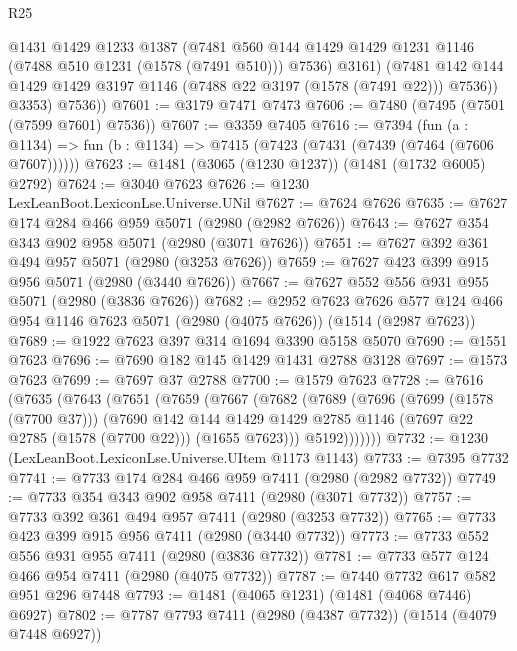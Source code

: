 \begin{lexlean}{R25}
\begin{coremodule}
              @1431
              @1429
              @1233
              @1387
              (@7481
                @560
                @144
                @1429
                @1429
                @1231
                @1146
                (@7488 @510 @1231 (@1578 (@7491 @510)))
                @7536)
              @3161)
            (@7481 @142 @144 @1429 @1429 @3197 @1146 (@7488 @22 @3197 (@1578 (@7491 @22))) @7536))
          @3353)
        @7536))
@7601 := @3179 @7471 @7473
@7606 := @7480 (@7495 (@7501 (@7599 @7601) @7536))
@7607 := @3359 @7405
@7616 := @7394
    (fun (a : @1134) => fun (b : @1134) => @7415 (@7423 (@7431 (@7439 (@7464 (@7606 @7607))))))
@7623 := @1481 (@3065 (@1230 @1237)) (@1481 (@1732 @6005) @2792)
@7624 := @3040 @7623
@7626 := @1230 LexLeanBoot.LexiconLse.Universe.UNil
@7627 := @7624 @7626
@7635 := @7627 @174 @284 @466 @959 @5071 (@2980 (@2982 @7626))
@7643 := @7627 @354 @343 @902 @958 @5071 (@2980 (@3071 @7626))
@7651 := @7627 @392 @361 @494 @957 @5071 (@2980 (@3253 @7626))
@7659 := @7627 @423 @399 @915 @956 @5071 (@2980 (@3440 @7626))
@7667 := @7627 @552 @556 @931 @955 @5071 (@2980 (@3836 @7626))
@7682 := @2952
    @7623
    @7626
    @577
    @124
    @466
    @954
    @1146
    @7623
    @5071
    (@2980 (@4075 @7626))
    (@1514 (@2987 @7623))
@7689 := @1922 @7623 @397 @314 @1694 @3390 @5158 @5070
@7690 := @1551 @7623
@7696 := @7690 @182 @145 @1429 @1431 @2788 @3128
@7697 := @1573 @7623
@7699 := @7697 @37 @2788
@7700 := @1579 @7623
@7728 := @7616
    (@7635
      (@7643
        (@7651
          (@7659
            (@7667
              (@7682
                (@7689
                  (@7696
                    (@7699 (@1578 (@7700 @37)))
                    (@7690
                      @142
                      @144
                      @1429
                      @1429
                      @2785
                      @1146
                      (@7697 @22 @2785 (@1578 (@7700 @22)))
                      (@1655 @7623)))
                  @5192)))))))
@7732 := @1230 (LexLeanBoot.LexiconLse.Universe.UItem @1173 @1143)
@7733 := @7395 @7732
@7741 := @7733 @174 @284 @466 @959 @7411 (@2980 (@2982 @7732))
@7749 := @7733 @354 @343 @902 @958 @7411 (@2980 (@3071 @7732))
@7757 := @7733 @392 @361 @494 @957 @7411 (@2980 (@3253 @7732))
@7765 := @7733 @423 @399 @915 @956 @7411 (@2980 (@3440 @7732))
@7773 := @7733 @552 @556 @931 @955 @7411 (@2980 (@3836 @7732))
@7781 := @7733 @577 @124 @466 @954 @7411 (@2980 (@4075 @7732))
@7787 := @7440 @7732 @617 @582 @951 @296 @7448
@7793 := @1481 (@4065 @1231) (@1481 (@4068 @7446) @6927)
@7802 := @7787 @7793 @7411 (@2980 (@4387 @7732)) (@1514 (@4079 @7448 @6927))

\end{coremodule}
\end{lexlean}
